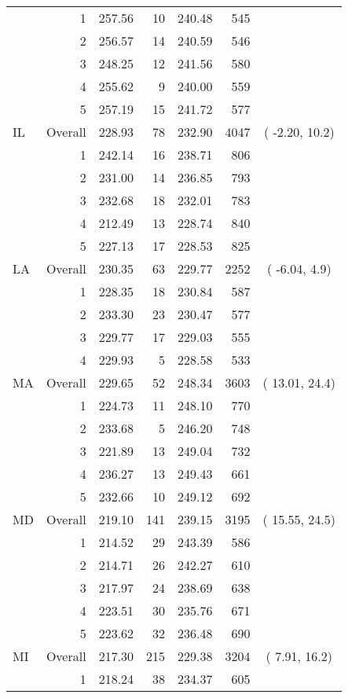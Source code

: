 \begin{longtable}{lrrr@{\extracolsep{.25cm}}rrc}
   & 1 & 257.56 &  10 & 240.48 & 545 &  \\ 
   & 2 & 256.57 &  14 & 240.59 & 546 &  \\ 
   & 3 & 248.25 &  12 & 241.56 & 580 &  \\ 
   & 4 & 255.62 &   9 & 240.00 & 559 &  \\ 
   & 5 & 257.19 &  15 & 241.72 & 577 &  \\ 
   \hline
IL & Overall & 228.93 &  78 & 232.90 & 4047 & ( -2.20, 10.2) \\ 
   & 1 & 242.14 &  16 & 238.71 & 806 &  \\ 
   & 2 & 231.00 &  14 & 236.85 & 793 &  \\ 
   & 3 & 232.68 &  18 & 232.01 & 783 &  \\ 
   & 4 & 212.49 &  13 & 228.74 & 840 &  \\ 
   & 5 & 227.13 &  17 & 228.53 & 825 &  \\ 
   \hline
LA & Overall & 230.35 &  63 & 229.77 & 2252 & ( -6.04,  4.9) \\ 
   & 1 & 228.35 &  18 & 230.84 & 587 &  \\ 
   & 2 & 233.30 &  23 & 230.47 & 577 &  \\ 
   & 3 & 229.77 &  17 & 229.03 & 555 &  \\ 
   & 4 & 229.93 &   5 & 228.58 & 533 &  \\ 
   \hline
MA & Overall & 229.65 &  52 & 248.34 & 3603 & ( 13.01, 24.4) \\ 
   & 1 & 224.73 &  11 & 248.10 & 770 &  \\ 
   & 2 & 233.68 &   5 & 246.20 & 748 &  \\ 
   & 3 & 221.89 &  13 & 249.04 & 732 &  \\ 
   & 4 & 236.27 &  13 & 249.43 & 661 &  \\ 
   & 5 & 232.66 &  10 & 249.12 & 692 &  \\ 
   \hline
MD & Overall & 219.10 & 141 & 239.15 & 3195 & ( 15.55, 24.5) \\ 
   & 1 & 214.52 &  29 & 243.39 & 586 &  \\ 
   & 2 & 214.71 &  26 & 242.27 & 610 &  \\ 
   & 3 & 217.97 &  24 & 238.69 & 638 &  \\ 
   & 4 & 223.51 &  30 & 235.76 & 671 &  \\ 
   & 5 & 223.62 &  32 & 236.48 & 690 &  \\ 
   \hline
MI & Overall & 217.30 & 215 & 229.38 & 3204 & (  7.91, 16.2) \\ 
   & 1 & 218.24 &  38 & 234.37 & 605 &  \\ 

\end{longtable}
